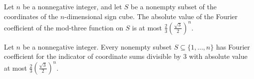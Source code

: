 \begin{theorem}
\label{FABL.abs_fourierCoeff_modThree_le}
\leanok
{}
Let $n$ be a nonnegative integer, and let $S$ be a nonempty subset of the coordinates of
the $n$-dimensional sign cube. The absolute value of the Fourier coefficient of the
mod-three function on $S$ is at most $\frac{2}{3}\left(\frac{\sqrt{3}}{2}\right)^n$.
\end{theorem}

\begin{theorem}
\label{FABL.modThree_isFourierRegular}
\leanok
{}
Let $n$ be a nonnegative integer. Every nonempty subset $S\subseteq\{1,\ldots,n\}$
has Fourier coefficient for the indicator of coordinate sums divisible by $3$ with
absolute value at most $\frac23(\frac{\sqrt3}{2})^n$.
\end{theorem}
